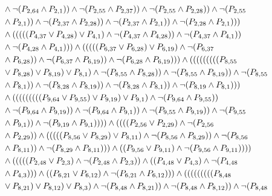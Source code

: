\documentclass[10pt]{article}
\begin{document}
\begin{align*}
& \land \lnot(\PV{2,64} \land \PV{2,1})) \land \lnot(\PV{2,55} \land \PV{2,37})) \land \lnot(\PV{2,55} \land \PV{2,28})) \land \lnot(\PV{2,55} \\
& \land \PV{2,1})) \land \lnot(\PV{2,37} \land \PV{2,28})) \land \lnot(\PV{2,37} \land \PV{2,1})) \land \lnot(\PV{2,28} \land \PV{2,1}))) \\
& \land (((((\PV{4,37} \lor \PV{4,28}) \lor \PV{4,1}) \land \lnot(\PV{4,37} \land \PV{4,28})) \land \lnot(\PV{4,37} \land \PV{4,1})) \\
& \land \lnot(\PV{4,28} \land \PV{4,1}))) \land (((((\PV{6,37} \lor \PV{6,28}) \lor \PV{6,19}) \land \lnot(\PV{6,37} \\
& \land \PV{6,28})) \land \lnot(\PV{6,37} \land \PV{6,19})) \land \lnot(\PV{6,28} \land \PV{6,19}))) \land (((((((((\PV{8,55} \\
& \lor \PV{8,28}) \lor \PV{8,19}) \lor \PV{8,1}) \land \lnot(\PV{8,55} \land \PV{8,28})) \land \lnot(\PV{8,55} \land \PV{8,19})) \land \lnot(\PV{8,55} \\
& \land \PV{8,1})) \land \lnot(\PV{8,28} \land \PV{8,19})) \land \lnot(\PV{8,28} \land \PV{8,1})) \land \lnot(\PV{8,19} \land \PV{8,1}))) \\
& \land (((((((((\PV{9,64} \lor \PV{9,55}) \lor \PV{9,19}) \lor \PV{9,1}) \land \lnot(\PV{9,64} \land \PV{9,55})) \\
& \land \lnot(\PV{9,64} \land \PV{9,19})) \land \lnot(\PV{9,64} \land \PV{9,1})) \land \lnot(\PV{9,55} \land \PV{9,19})) \land \lnot(\PV{9,55} \\
& \land \PV{9,1})) \land \lnot(\PV{9,19} \land \PV{9,1})))) \land ((((\PV{2,56} \lor \PV{2,29}) \land \lnot(\PV{2,56} \\
& \land \PV{2,29})) \land (((((\PV{8,56} \lor \PV{8,29}) \lor \PV{8,11}) \land \lnot(\PV{8,56} \land \PV{8,29})) \land \lnot(\PV{8,56} \\
& \land \PV{8,11})) \land \lnot(\PV{8,29} \land \PV{8,11}))) \land ((\PV{9,56} \lor \PV{9,11}) \land \lnot(\PV{9,56} \land \PV{9,11})))) \\
& \land (((((\PV{2,48} \lor \PV{2,3}) \land \lnot(\PV{2,48} \land \PV{2,3})) \land ((\PV{4,48} \lor \PV{4,3}) \land \lnot(\PV{4,48} \\
& \land \PV{4,3}))) \land ((\PV{6,21} \lor \PV{6,12}) \land \lnot(\PV{6,21} \land \PV{6,12}))) \land (((((((((\PV{8,48} \\
& \lor \PV{8,21}) \lor \PV{8,12}) \lor \PV{8,3}) \land \lnot(\PV{8,48} \land \PV{8,21})) \land \lnot(\PV{8,48} \land \PV{8,12})) \land \lnot(\PV{8,48} \\

\end{align*}
\end{document}
